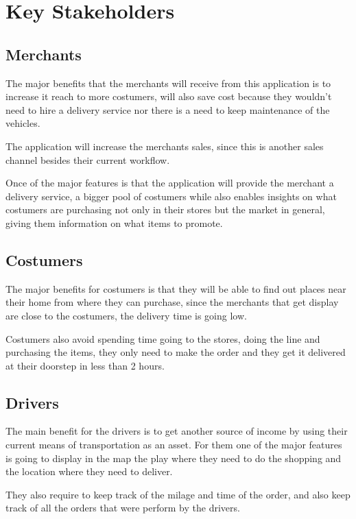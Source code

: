 \section{Key Stakeholders}

\subsection{Merchants}
The major benefits that the merchants will receive from this application is to 
increase it reach to more costumers, will also save cost because they wouldn't 
need to hire a delivery service nor there is a need to keep maintenance of 
the vehicles.\newline

\noindent The application will increase the merchants sales, since this is 
another sales channel besides their current workflow.\newline

\noindent Once of the major features is that the application will provide 
the merchant a delivery service, a bigger pool of costumers while also 
enables insights on what costumers are purchasing not only in their stores 
but the market in general, giving them information on what items to promote.

\subsection{Costumers}

The major benefits for costumers is that they will be able to 
find out places near their home from where they can purchase, since the 
merchants that get display are close to the costumers, the delivery time is
going low.\newline

\noindent Costumers also avoid spending time going to the stores, doing the 
line and purchasing the items, they only need to make the order and they 
get it delivered at their doorstep in less than 2 hours.

\subsection{Drivers}

The main benefit for the drivers is to get another source of income by using 
their current means of transportation as an asset. For them one of the major 
features is going to display in the map the play where they need to do the 
shopping and the location where they need to deliver. \newline

\noindent They also require to keep track of the milage and time of the order, 
and also keep track of all the orders that were perform by the drivers.